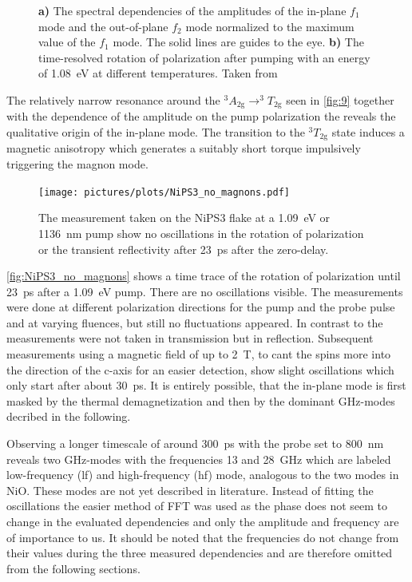 \begin{figure}[ht]
\begin{subfigure}[b]{0.28\textwidth}
        \caption{}
        \label{fig:10}
    \end{subfigure}
    \caption{\textbf{a)} The spectral dependencies of the amplitudes of the in-plane $f_1$ mode and the out-of-plane $f_2$ mode normalized to the maximum value of the $f_1$ mode. The solid lines are guides to the eye. \textbf{b)} The time-resolved rotation of polarization after pumping with an energy of \qty{1.08}{eV} at different temperatures. Taken from }
\end{figure}
\FloatBarrier
The relatively narrow resonance around the $^3A_{2\text{g}} \rightarrow ^3T_{2\text{g}}$ seen in \autoref{fig:9} together with the dependence of the amplitude on the pump polarization the reveals the qualitative origin of the in-plane mode.
The transition to the $^3T_{2\text{g}}$ state induces a magnetic anisotropy which generates a suitably short torque impulsively triggering the magnon mode.
\begin{figure}[ht]
    \centering
    \texttt{[image: pictures/plots/NiPS3\_no\_magnons.pdf]} \vspace{-0.3cm}
    \caption{The measurement taken on the NiPS3 flake at a \qty{1.09}{eV} or \qty{1136}{nm} pump show no oscillations in the rotation of polarization or the transient reflectivity after \qty{23}{ps} after the zero-delay.}
    \label{fig:NiPS3_no_magnons}
\end{figure}
\FloatBarrier
\autoref{fig:NiPS3_no_magnons} shows a time trace of the rotation of polarization until \qty{23}{ps} after a \qty{1.09}{eV} pump.
There are no oscillations visible.
The measurements were done at different polarization directions for the pump and the probe pulse and at varying fluences, but still no fluctuations appeared.
In contrast to  the measurements were not taken in transmission but in reflection.
Subsequent measurements using a magnetic field of up to \qty{2}{T}, to cant the spins more into the direction of the c-axis for an easier detection, show slight oscillations which only start after about \qty{30}{ps}.
It is entirely possible, that the in-plane mode is first masked by the thermal demagnetization and then by the dominant GHz-modes decribed in the following.

Observing a longer timescale of around \qty{300}{ps} with the probe set to \qty{800}{nm} reveals two GHz-modes with the frequencies 13 and \qty{28}{GHz} which are labeled low-frequency (lf) and high-frequency (hf) mode, analogous to the two modes in NiO.
These modes are not yet described in literature.
Instead of fitting the oscillations the easier method of FFT was used as the phase does not seem to change in the evaluated dependencies and only the amplitude and frequency are of importance to us.
It should be noted that the frequencies do not change from their values during the three measured dependencies and are therefore omitted from the following sections.

